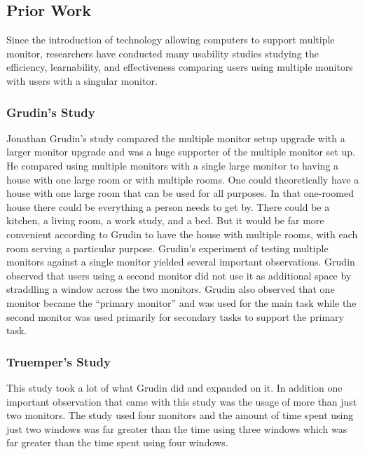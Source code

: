 \documentclass[a4paper]{article}
\begin{document}
\subsection{Prior Work}
Since the introduction of technology allowing computers to support multiple monitor, researchers have conducted many usability studies studying the efficiency, learnability, and effectiveness comparing users using multiple monitors with users with a singular monitor.

\subsubsection{Grudin's Study}
Jonathan Grudin's study compared the multiple monitor setup upgrade with a larger monitor upgrade and was a huge supporter of the multiple monitor set up. He compared using multiple monitors with a single large monitor to having a house with one large room or with multiple rooms. One could theoretically have a house with one large room that can be used for all purposes. In that one-roomed house there could be everything a person needs to get by. There could be a kitchen, a living room, a work study, and a bed. But it would be far more convenient according to Grudin to have the house with multiple rooms, with each room serving a particular purpose.\cite{Grudin} Grudin's experiment of testing multiple monitors against a single monitor yielded several important observations. Grudin observed that users using a second monitor did not use it as additional space by straddling a window across the two monitors.\cite{Grudin} Grudin also observed that one monitor became the ``primary monitor'' and was used for the main task while the second monitor was used primarily for secondary tasks to support the primary task.

\subsubsection{Truemper's Study}
This study took a lot of what Grudin did and expanded on it. In addition one important observation that came with this study was the usage of more than just two monitors. The study used four monitors and the amount of time spent using just two windows was far greater than the time using three windows which was far greater than the time spent using four windows.
\end{document}
